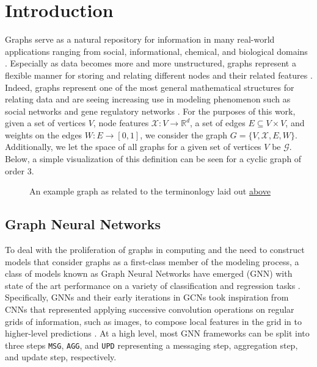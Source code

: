 \section{Introduction}
\label{sec:intro}
Graphs serve as a natural repository for information in many real-world applications ranging from social, informational, chemical, and biological domains \cite{cho_friendship_2011}. Especially as data becomes more and more unstructured, graphs represent a flexible manner for storing and relating different nodes and their related features \cite{washio_state_2003}. Indeed, graphs represent one of the most general mathematical structures for relating data and are seeing increasing use in modeling phenomenon such as social networks and gene regulatory networks \cite{washio_state_2003,petralia_new_2016}. For the purposes of this work, given a set of vertices $V$, node features $\mathcal{X} : V \rightarrow \mathbb{R}^{d}$, a set of edges $E \subseteq V \times V$, and weights on the edges $W : E \rightarrow [0,1]$, we consider the graph $G = \{V, \mathcal{X}, E, W\}$. Additionally, we let the space of all graphs for a given set of vertices $V$ be $\mathcal{G}$. Below, a simple visualization of this definition can be seen for a cyclic graph of order 3.
\begin{figure}[b]
  \centering
  
  \caption{An example graph as related to the terminonlogy laid out \hyperref[sec:intro]{above}}
\end{figure}

\subsection{Graph Neural Networks}
To deal with the proliferation of graphs in computing and the need to construct models that consider graphs as a first-class member of the modeling process, a class of models known as Graph Neural Networks have emerged (GNN) with state of the art performance on a variety of classification and regression tasks \cite{ying_gnnexplainer_2019}. Specifically, GNNs and their early iterations in GCNs took inspiration from CNNs that represented applying successive convolution operations on regular grids of information, such as images, to compose local features in the grid in to higher-level predictions \cite{defferrard_convolutional_2017}. At a high level, most GNN frameworks can be split into three steps \verb|MSG|, \verb|AGG|, and \verb|UPD| representing a messaging step, aggregation step, and update step, respectively.

